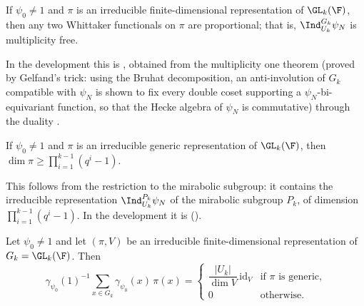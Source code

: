 \begin{littheorem}
\label{pf:sh-siegel:ggmult}
If $\psi_0\ne1$ and $\pi$ is an irreducible finite-dimensional representation of $\GL_k(\F)$, then any two Whittaker
functionals on $\pi$ are proportional; that is, $\Ind_{U_k}^{G_k}\psi_N$ is multiplicity free.
\end{littheorem}

In the development this is , obtained from the multiplicity
one theorem  (proved by
Gelfand's trick: using the Bruhat decomposition, an anti-involution of $G_k$ compatible with $\psi_N$ is shown to fix every
double coset supporting a $\psi_N$-bi-equivariant function, so that the Hecke algebra of $\psi_N$ is commutative) through
the duality .

\begin{littheorem}\label{pf:sh-siegel:mirab}
If $\psi_0\ne1$ and $\pi$ is an irreducible generic representation of $\GL_k(\F)$, then
$\dim\pi\ge\prod_{i=1}^{k-1}(q^i-1)$.
\end{littheorem}

This follows from the restriction to the mirabolic subgroup: it contains the irreducible representation
$\Ind_{U_k}^{P_k}\psi_N$ of the mirabolic subgroup $P_k$, of dimension $\prod_{i=1}^{k-1}(q^i-1)$. In the development it is
 ().

\begin{lemma}\label{pf:sh-siegel:convscalar}
Let $\psi_0\ne1$ and let $(\pi,V)$ be an irreducible finite-dimensional representation of $G_k=\GL_k(\F)$. Then
\[
\gamma_{\psi_0}(1)^{-1}\sum_{x\in G_k}\gamma_{\psi_0}(x)\,\pi(x)=
\begin{cases}\dfrac{|U_k|}{\dim V}\,\mathrm{id}_V&\text{if $\pi$ is generic,}\\[1ex] 0&\text{otherwise.}\end{cases}
\]
\end{lemma}

